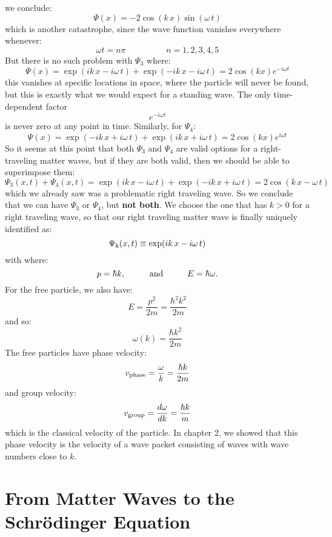 \documentclass[12pt]{book}
\begin{document}
we conclude:
$$\Psi(x) = -2\cos(k\,x) \sin(\omega \, t)$$
which is another catastrophe, since the wave function vanishes everywhere whenever:
$$\omega t = n \pi \hspace{2cm} n=1,2,3,4,5$$
But there is no such problem with $\Psi_3$ where:
$$\Psi(x) = \exp(ik\,x-i\omega \, t) + \exp(-ik\,x-i\omega \, t) = 2 \cos(kx) e^{\displaystyle -i\omega t}$$
this vanishes at specific locations in space, where the particle will never be found, but this is exactly what we would expect for a standing wave.  The only time-dependent factor 
$$e^{\displaystyle -i \omega t}$$
is never zero at any point in time.  Similarly, for $\Psi_4$:
$$\Psi(x) = \exp(-ik\,x+i\omega \, t) + \exp(ik\,x+i\omega \, t) = 2 \cos(kx) e^{\displaystyle i\omega t}$$
So it seems at this point that both $\Psi_3$ and $\Psi_4$ are valid options for a right-traveling matter waves, but if they are both valid, then we should be able to superimpose them:
$$\Psi_3(x,t) + \Psi_4(x,t) = \exp(ik\,x-i\omega \, t) + \exp(-ik\,x+i\omega \, t)
= 2 \cos(k\,x-\omega\,t)$$
which we already saw was a problematic right traveling wave.  So we conclude that we can have $\Psi_3$ or $\Psi_4$, but {\bf not both}.  We choose the one that has $k>0$ for a right traveling wave, so that our right traveling matter wave is finally uniquely identified as:
\begin{equation}
\Psi_{\rm k}(x,t) \equiv \exp(ik\,x-i \omega \, t)
\end{equation}
with where:
$$p=\hbar k, \hspace{1cm} {\rm and} \hspace{1cm} E = \hbar \omega.$$
For the free particle, we also have:
\begin{equation}
E = \frac{p^2}{2m} = \frac{\hbar^2 k^2}{2m}
\end{equation}
and so:
\begin{equation}
\omega(k) = \frac{\hbar k^2}{2m} 
\end{equation}
The free particles have phase velocity:
$$v_{\rm phase} = \frac{\omega}{k} = \frac{\hbar k}{2m}$$
and group velocity:
$$v_{\rm group} = \frac{d\omega}{dk} = \frac{\hbar k}{m}$$
which is the classical velocity of the particle.  In chapter 2, we showed that this phase velocity is the velocity of a wave packet consisting of waves with wave numbers close to $k$.

 \section{From Matter Waves to the Schr\"odinger Equation}
\end{document}
